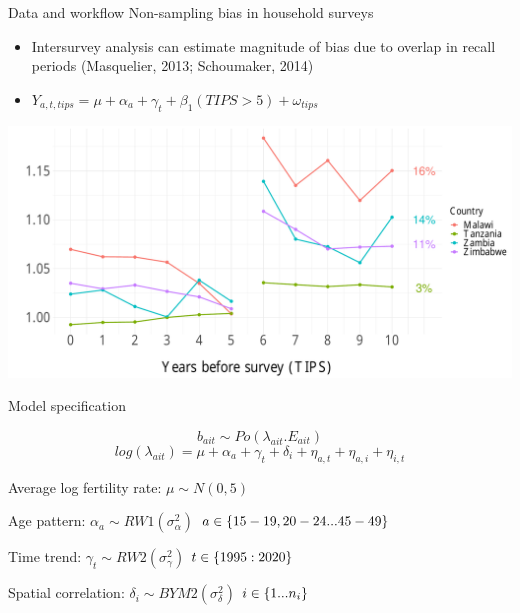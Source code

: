 \documentclass[ignorenonframetext,]{beamer}
\providecommand{\tightlist}{%
  \setlength{\itemsep}{0pt}\setlength{\parskip}{0pt}}
\begin{document}
\begin{frame}[t]{Data and workflow \textbar{} Non-sampling bias in
household surveys}
\protect\hypertarget{data-and-workflow-non-sampling-bias-in-household-surveys-3}{}

\begin{itemize}
\tightlist
\item
  Intersurvey analysis can estimate magnitude of bias due to overlap in
  recall periods (Masquelier, 2013; Schoumaker, 2014)
\item
  \(Y_{a,t,tips} = \mu + \alpha_a + \gamma_t + \beta_1(TIPS>5) + \omega_{tips}\)
\end{itemize}

\begin{center}\includegraphics[height=0.5\textheight]{2020_04_UNPD_files/figure-beamer/unnamed-chunk-4-1} \end{center}

\end{frame}

\begin{frame}[t]{Model specification}
\protect\hypertarget{model-specification}{}

\[b_{ait} \sim Po( \lambda_{ait} . E_{ait} )\]
\[log(\lambda_{ait}) = \mu + \alpha_a + \gamma_t + \delta_i + \eta_{a,t} + \eta_{a,i} + \eta_{i,t}\]

Average log fertility rate: \(\mu \sim N(0, 5)\)

Age pattern: \(\alpha_a \sim RW1(\sigma^2_\alpha)\)
\(\hfill a \in \{15-19, 20-24 ... 45-49\}\)

Time trend: \(\gamma_t \sim RW2(\sigma^2_\gamma)\)
\(\hfill t \in \{1995:2020\}\)

Spatial correlation: \(\delta_i \sim BYM2(\sigma^2_\delta)\)
\(\hfill i \in \{1 ... n_i\}\)

\end{frame}
\end{document}
